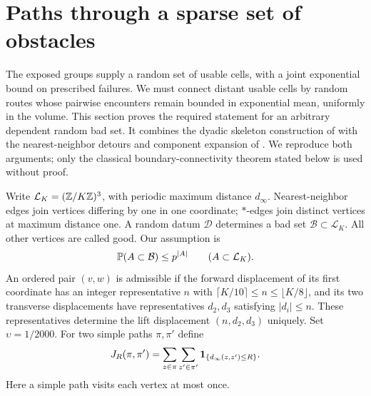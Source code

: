 \section{Paths through a sparse set of obstacles}\label{sec:lattice}

The exposed groups supply a random set of usable cells, with a joint
exponential bound on prescribed failures.  We must connect distant usable
cells by random routes whose pairwise encounters remain bounded in
exponential mean, uniformly in the volume.  This section proves the
required statement for an arbitrary dependent random bad set.  It combines
the dyadic skeleton construction of \citet[Section~8.1, Lemma~8.1]{B}
with the nearest-neighbor detours and component expansion of
\citet[Section~7, Proposition~7.1]{HS}.  We reproduce both arguments;
only the classical boundary-connectivity theorem stated below is used
without proof.

Write $\mathcal L_K=(\mathbb Z/K\mathbb Z)^3$, with periodic maximum distance $d_\infty$.
Nearest-neighbor edges join vertices differing by one in one coordinate;
$*$-edges join distinct vertices at maximum distance one.  A random datum
$\mathcal D$ determines a bad set $\mathcal B\subset\mathcal L_K$.
All other vertices are called good.  Our assumption is
\begin{equation}\label{lattice:bad-law}
 \mathbb P(A\subset\mathcal B)\le p^{|A|}
 \qquad(A\subset\mathcal L_K).
\end{equation}
An ordered pair $(v,w)$ is admissible if the forward displacement of its
first coordinate has an integer representative $n$ with
$\lceil K/10\rceil\le n\le\lfloor K/8\rfloor$, and its two transverse
displacements have representatives $d_2,d_3$ satisfying $|d_i|\le n$.
These representatives determine the lift displacement $(n,d_2,d_3)$ uniquely.
Set $\upsilon=1/2000$.
For two simple paths $\pi,\pi'$ define
\begin{equation}\label{lattice:contact-definition}
 J_R(\pi,\pi')=
 \sum_{z\in\pi}\sum_{z'\in\pi'}
              \mathbf 1_{\{d_\infty(z,z')\le R\}}.
\end{equation}
Here a simple path visits each vertex at most once.

